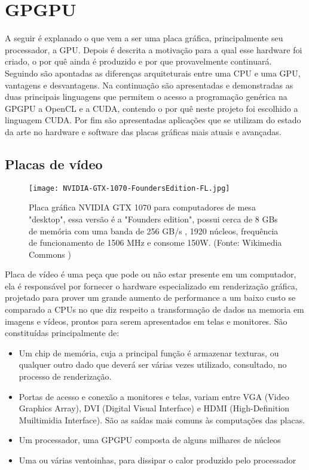 \chapter{GPGPU}
\label{cap:gpgpu}

A seguir é explanado o que vem a ser uma placa gráfica, principalmente seu processador, a GPU. Depois é descrita a motivação para a qual esse hardware foi criado, o por quê ainda é produzido e por que provavelmente continuará. Seguindo são apontadas as diferenças arquiteturais entre uma CPU e uma GPU, vantagens e desvantagens. Na continuação são apresentadas e demonstradas as duas principais linguagens que permitem o acesso a programação genérica na GPGPU a OpenCL e a CUDA, contendo o por quê neste projeto foi escolhido a linguagem CUDA. Por fim são apresentadas aplicações que se utilizam do estado da arte no hardware e software das placas gráficas mais atuais e avançadas.

\section{Placas de vídeo}
\label{sec:video_boards}
  \begin{figure}[!h]
    \centering
    \texttt{[image: NVIDIA-GTX-1070-FoundersEdition-FL.jpg]}
    \caption{Placa gráfica NVIDIA GTX 1070 para computadores de mesa "desktop", essa versão é a "Founders edition", possui cerca de 8 GBs de memória com uma banda de 256 GB/s , 1920 núcleos, frequência de funcionamento de 1506 MHz e consome 150W. (Fonte: Wikimedia Commons \protect\footnotemark)}
    \label{fig:gtx1070}
  \end{figure}


  Placa de vídeo é uma peça que pode ou não estar presente em um computador, ela é responsável por fornecer o hardware especializado em renderização gráfica, projetado para prover um grande aumento de performance a um baixo custo se comparado a CPUs no que diz respeito a transformação de dados na memoria em imagens e vídeos, prontos para serem apresentados em telas e monitores. São constituídas principalmente de:
  \begin{itemize}
    \item Um chip de memória, cuja a principal função é armazenar texturas, ou qualquer outro dado que deverá ser várias vezes utilizado, consultado, no processo de renderização.
    \item Portas de acesso e conexão a monitores e telas, variam entre VGA (Video Graphics Array), DVI (Digital Visual Interface) e HDMI (High-Definition Muiltimidia Interface). São as saídas mais comuns às computações das placas.
    \item Um processador, uma GPGPU composta de alguns milhares de núcleos
    \item Uma ou várias ventoinhas, para dissipar o calor produzido pelo processador
  \end{itemize}


